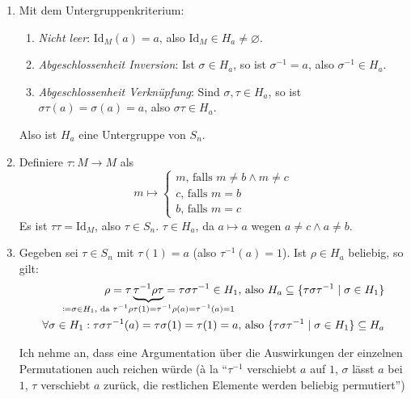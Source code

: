 \begin{enumerate}
	\item Mit dem Untergruppenkriterium:
	\begin{enumerate}
	 	\item \emph{Nicht leer}: \( \text{Id}_M(a) = a \), also \( \text{Id}_M \in H_a \neq \varnothing \).
	 	\item \emph{Abgeschlossenheit Inversion}: Ist \( \sigma \in H_a \), so ist \( \sigma^{-1} = a \), also \( \sigma^{-1} \in H_a \).
	 	\item \emph{Abgeschlossenheit Verknüpfung}: Sind \( \sigma, \tau \in H_a \), so ist \( \sigma \tau(a) = \sigma(a) = a \), also \( \sigma \tau \in H_a \). 
	 \end{enumerate} 
	 Also ist \( H_a \) eine Untergruppe von \( S_n \).

	 \item Definiere \( \tau: M \to M \) als
	 \begin{equation*}
	 	m \mapsto \begin{cases}
	 		m \text{, falls } m \neq b \wedge m \neq c \\
	 		c \text{, falls } m = b \\
	 		b \text{, falls } m = c 
	 	\end{cases}
	 \end{equation*}
	 Es ist \( \tau \tau = \text{Id}_M \), also \( \tau \in S_n \). \( \tau \in H_a \), da \( a \mapsto a \) wegen \( a \neq c \wedge a \neq b \).

	 \item Gegeben sei \( \tau \in S_n \) mit \( \tau(1) = a \) (also \( \tau^{-1}(a) = 1 \)). Ist \( \rho \in H_a \) beliebig, so gilt:
	 \begin{align*}
	 	\rho = \tau \underbrace{\tau^{-1} \rho \tau}_{\mathclap{\coloneqq \sigma \in H_1 \text{, da } \tau^{-1} \rho \tau(1) = \tau^{-1} \rho(a) = \tau^{-1}(a) = 1}} = \tau \sigma \tau^{-1} \in H_1 &\text{, also } H_a \subseteq \{ \tau \sigma \tau^{-1} \mid \sigma \in H_1 \} \\
	 	\forall \sigma \in H_1 : \tau \sigma \tau^{-1}(a) = \tau \sigma(1) = \tau(1) = a &\text{, also } \{ \tau \sigma \tau^{-1} \mid \sigma \in H_1 \} \subseteq H_a
	 \end{align*}
	 \begin{remark}
	 	Ich nehme an, dass eine Argumentation über die Auswirkungen der einzelnen Permutationen auch reichen würde (à la ``\( \tau^{-1} \) verschiebt \( a \) auf \( 1 \), \( \sigma \) lässt \( a \) bei \( 1 \), \( \tau \) verschiebt \( a \) zurück, die restlichen Elemente werden beliebig permutiert'')
	 \end{remark}
\end{enumerate}

